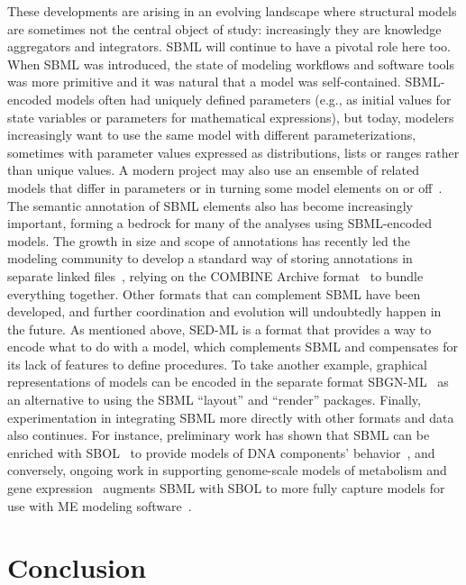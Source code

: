 \documentclass[]{draft-sbml-paper}
\begin{document}
These developments are arising in an evolving landscape where structural models are sometimes not the central object of study: increasingly they are knowledge aggregators and integrators.  SBML will continue to have a pivotal role here too.  When SBML was introduced, the state of modeling workflows and software tools was more primitive and it was natural that a model was self-contained.  SBML-encoded models often had uniquely defined parameters (e.g., as initial values for state variables or parameters for mathematical expressions), but today, modelers increasingly want to use the same model with different parameterizations, sometimes with parameter values expressed as distributions, lists or ranges rather than unique values.  A modern project may also use an ensemble of related models that differ in parameters or in turning some model elements on or off~\citep{kuepfer2007ensemble, waltemath2016toward}.  The semantic annotation of SBML elements also has become increasingly important, forming a bedrock for many of the analyses using SBML-encoded models.  The growth in size and scope of annotations has recently led the modeling community to develop a standard way of storing annotations in separate linked files~\citep{Neal2019harmonizing}, relying on the COMBINE Archive format~\citep{bergmann2014combine} to bundle everything together.  Other formats that can complement SBML have been developed, and further coordination and evolution will undoubtedly happen in the future.  As mentioned above, SED-ML is a format that provides a way to encode what to do with a model, which complements SBML and compensates for its lack of features to define procedures.  To take another example, graphical representations of models can be encoded in the separate format SBGN-ML~\citep{VanIersel2012} as an alternative to using the SBML ``layout'' and ``render'' packages.  Finally, experimentation in integrating SBML more directly with other formats and data also continues.  For instance, preliminary work has shown that SBML can be enriched with SBOL~\citep{galdzicki_2014} to provide models of DNA components' behavior~\citep{Roehner2014a}, and conversely, ongoing work in supporting genome-scale models of metabolism and gene expression~\citep[known as \emph{ME-models}, ][]{Thiele2012multiscale} augments SBML with SBOL to more fully capture models for use with ME modeling software~\citep{voigt2018sbmlme}.


\section*{Conclusion}
\end{document}
